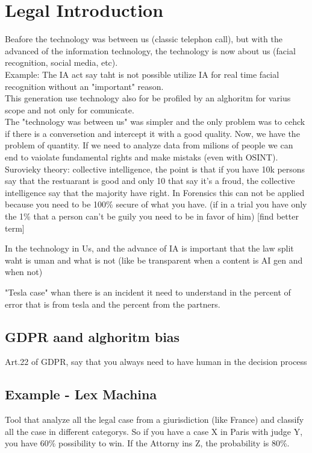 \chapter{Legal Introduction}

Beafore the technology was between us (classic telephon call), but with the advanced of the information technology,
the technology is now about us (facial recognition, social media, etc). \\
Example: The IA act say taht is not possible utilize IA for real time facial recognition without an "important" reason.\\
This generation use technology also for be profiled by an alghoritm for varius scope and not only for comunicate.   \\

The "technology was between us" was simpler and the only problem was to cehck if there is a conversetion and intercept it with a good quality.
Now, we have the problem of quantity. If we need to analyze data from milions of people we can end to vaiolate fundamental rights and make mistaks
(even with OSINT). \\
Surovieky theory: collective intelligence, the point is that if you have 10k persons say that the restuarant is good and only 10 that say it's a froud,
the collective intelligence say that the majority have right. In Forensics this can not be applied because you need to be 100\% secure of what you have.
(if in a trial you have only the 1\% that a person can't be guily you need to be in favor of him) [find better term]

In the technology in Us, and the advance of IA is important that the law split waht is uman and what is not (like be transparent when a content is AI gen and when not)

"Tesla case" whan there is an incident it need to understand in the percent of error that is from tesla and the percent from the partners.

\section{GDPR aand alghoritm bias}

Art.22 of GDPR, say that you always need to have human in the decision process

\section{Example - Lex Machina}
Tool that analyze all the legal case from a giurisdiction (like France) and classify
all the case in different categorys.
So if you have a case X in Paris with judge Y, you have 60\% possibility to win. If the Attorny ins Z, the probability is 80\%.

